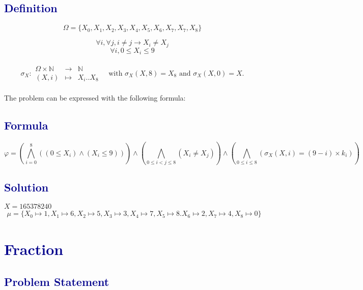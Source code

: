 \documentclass[12pt]{article}
\theoremstyle{definition}
\theoremstyle{plain}
\begin{document}
\subsection*{\textcolor{darkblue}{Definition}}
\begin{equation}
  \Omega = \{X_0, X_1, X_2, X_3, X_4, X_5, X_6, X_7, X_7, X_8\}
\end{equation}

\begin{equation}
    \forall i, \forall j, i \neq j \rightarrow X_i \neq X_j
\end{equation}
\begin{equation}
  \forall i, 0\leq X_i \leq 9
\end{equation}\\
\[
  \sigma_X:
  \begin{array}{rcl}
    \Omega\times \mathbb{N} & \longrightarrow & \mathbb{N}\\
    (X, i) & \longmapsto & X_{i}..X_8
  \end{array}
  \quad \text{with } \sigma_X(X,8) = X_8 \text{ and } \sigma_X(X,0) = X.
\]
\\
The problem can be expressed with the following formula:
\subsection*{\textcolor{darkblue}{Formula}}
\begin{equation}
  \varphi = \left(\bigwedge^8_{i=0}((0 \leq X_i)\wedge(X_i \leq 9))\right) \wedge \left(\bigwedge_{0 \leq i < j \leq 8}(X_i \neq X_j)\right) \wedge \left(\bigwedge_{0 \leq i \leq 8}(\sigma_X(X,i) = (9-i) \times k_i)\right)
\end{equation}

\subsection*{\textcolor{darkblue}{Solution}}
$X = 165378240$
\[
\boxed{\begin{aligned}
\mu = \{X_0 \mapsto 1, X_1 \mapsto 6, X_2 \mapsto 5, X_3 \mapsto 3, X_4 \mapsto 7, X_5 \mapsto 8. X_6 \mapsto 2, X_7 \mapsto 4, X_8 \mapsto 0 \}
\end{aligned}}
\]

\section*{\textcolor{darkblue}{Fraction}}
\subsection*{\textcolor{darkblue}{Problem Statement}}
\end{document}
